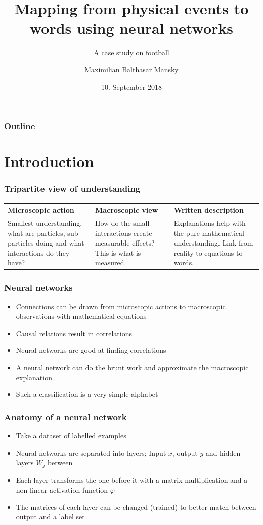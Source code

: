 \documentclass{beamer}
\title{Mapping from physical events to words using neural networks}
\subtitle{A case study on football}
\author[Maximilian Mansky]{Maximilian Balthasar Mansky} %
\institute[Dept. Math] %
{
  Department of Mathematics\\
  Uppsala University
}
\date[Sep 10, 2018] %
{10. September 2018}
\begin{document}
\begin{frame}[plain] %
  \titlepage
\end{frame}

\begin{frame}
    \frametitle{Outline}
    \tableofcontents[currentsection]
\end{frame}

\section{Introduction}

\begin{frame}
\frametitle{Tripartite view of understanding}
\begin{tabular}{p{}p{}p{}}
Microscopic action & Macroscopic view & Written description \\\hline
Smallest understanding, what are particles, sub-particles doing and what interactions do they have? &
 How do the small interactions create measurable effects? This is what is measured. & 
Explanations help with the pure mathematical understanding. Link from reality to equations to words.
\end{tabular}
\end{frame}

\begin{frame}
\frametitle{Neural networks}
\begin{itemize}
\item Connections can be drawn from microscopic actions to macroscopic observations with mathematical equations
\item Causal relations result in correlations
\item Neural networks are good at finding correlations
\item A neural network can do the brunt work and approximate the macroscopic explanation
\item Such a classification is a very simple alphabet
\end{itemize}
\end{frame}

\begin{frame}
\frametitle{Anatomy of a neural network}
\begin{itemize}
\item Take a dataset of labelled examples
\item Neural networks are separated into layers; Input $x$, output $y$ and hidden layers $W_j$ between
\item Each layer transforms the one before it with a matrix multiplication and a non-linear activation function $\varphi$
\item The matrices of each layer can be changed (trained) to better match between output and a label set
\end{itemize}
\end{frame}
\end{document}
